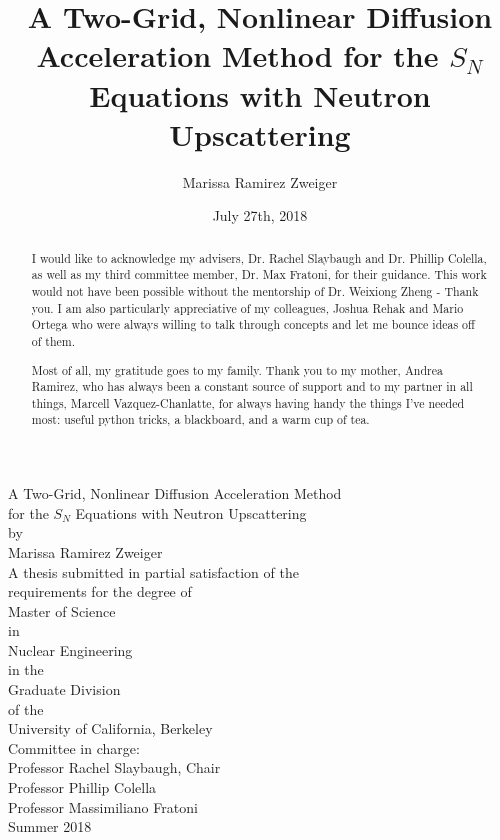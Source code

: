 \documentclass[12pt]{report}
\title{A Two-Grid, Nonlinear Diffusion Acceleration Method for the $S_N$ Equations with Neutron Upscattering}
\author{Marissa Ramirez Zweiger }
\date{July 27th, 2018}
\begin{document}
\pagestyle{empty}
\begin{center}
A Two-Grid, Nonlinear Diffusion Acceleration Method  \\ 
for the $S_N$ Equations with Neutron Upscattering \\
\vspace{20mm}
by \\
\vspace{5mm}
Marissa Ramirez Zweiger \\ 
\vspace{20mm}
A thesis submitted in partial
satisfaction of the \\
\vspace{5mm}
requirements for the degree of \\
\vspace{5mm}
Master of Science \\
\vspace{5mm}
in \\
\vspace{5mm}
Nuclear Engineering \\
\vspace{5mm}
in the \\
\vspace{5mm}
Graduate Division \\
\vspace{5mm}
of the \\
\vspace{5mm}
University of California, Berkeley \\
\vspace{20mm}
Committee in charge: \\
\vspace{5mm}
Professor Rachel Slaybaugh, Chair \\
Professor Phillip Colella \\
Professor Massimiliano Fratoni \\
\vspace{5mm}
Summer 2018
\end{center}



\renewcommand{\abstractname}{Acknowledgements}
\begin{abstract}
\thispagestyle{plain}
I would like to acknowledge my advisers, Dr. Rachel Slaybaugh and Dr. Phillip Colella, as well as my third committee member, Dr. Max Fratoni, for their guidance. This work would not have been possible without the mentorship of Dr. Weixiong Zheng - Thank you. I am also particularly appreciative of my colleagues, Joshua Rehak and Mario Ortega who were always willing to talk through concepts and let me bounce ideas off of them. 

Most of all, my gratitude goes to my family. Thank you to my mother, Andrea Ramirez, who has always been a constant source of support and to my partner in all things, Marcell Vazquez-Chanlatte, for always having handy the things I've needed most: useful python tricks, a blackboard, and a warm cup of tea. 
\end{abstract}
\end{document}
